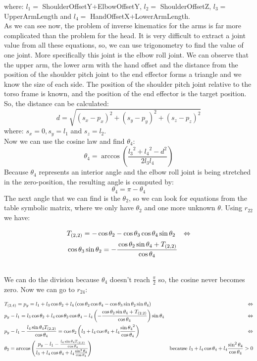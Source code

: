 where: $l_1 =$ ShoulderOffsetY$+$ElbowOffsetY, $l_2 =$ ShoulderOffsetZ, $l_3 =$ UpperArmLength and $l_4 =$ HandOffsetX$+$LowerArmLength.\\
As we can see now, the problem of inverse kinematics for the arms is far more complicated than the problem for the head. It is very difficult to extract a joint value from all these equations, so, we can use trigonometry to find the value of one joint. More specifically this joint is the elbow roll joint. We can observe that the upper arm, the lower arm with the hand offset and the distance from the position of the shoulder pitch joint to the end effector forms a triangle and we know the size of each side. The position of the shoulder pitch joint relative to the torso frame is known, and the position of the end effector is the target position. So, the distance can be calculated:
\[
d=\sqrt{\left(s_x-p_x\right)^2 + \left(s_y-p_y\right)^2 + \left(s_z-p_z\right)^2}
\]
where: \(s_x = 0, s_y = l_1\) and \(s_z = l_2\).\\
Now we can use the cosine law and find \(\theta_4\):
\[
\theta_4 = \arccos\left(\frac{{l_3}^2 + {l_4}^2 - d^2}{2l_3l_4}\right)
\]
Because \(\theta_4\) represents an interior angle and the elbow roll joint is being stretched in the zero-position, the resulting angle is computed by:
\[
\theta_4 = \pi - \theta_4
\]
The next angle that we can find is the \(\theta_2\), so we can look for equations from the table symbolic matrix, where we only have \(\theta_2\) and one more unknown \(\theta\). Using $r_{22}$ we have:
\begin{small}
\begin{align*}
&T_{(2,2)} = -\cos\theta_2 - \cos\theta_3\cos\theta_4\sin\theta_2 &\Leftrightarrow\\
&\cos\theta_3\sin\theta_2 = -\cfrac{\cos\theta_2\sin\theta_4 + T_{(2,2)}}{\cos\theta_4}
\end{align*}
\end{small}\\
We can do the division because $\theta_4$ doesn't reach $\frac{\pi}{2} $ so, the cosine never becomes zero. Now we can go to $r_{24}$:
\begin{small}
\begin{align*}
&T_{(2,4)} = p_y = l_1 + l_3\cos\theta_2 + l_4\left(\cos\theta_2\cos\theta_4 - \cos\theta_3\sin\theta_2\sin\theta_4\right)&\Leftrightarrow\\
&p_y - l_1 =l_3\cos\theta_2 + l_4\cos\theta_2\cos\theta_4 - l_4\left(-\frac{\cos\theta_2\sin\theta_4 + T_{(2,2)}}{\cos\theta_4}\right)\sin\theta_4&\Leftrightarrow\\
&p_y - l_1 - \frac{l_4\sin\theta_4 T_{(2,2)}}{\cos\theta_4} = \cos\theta_2\left(l_3 + l_4\cos\theta_4 + l_4\frac{{\sin\theta_4}^2}{\cos\theta_4}\right)&\Leftrightarrow\\
&\theta_2 = \arccos\left(\cfrac{p_y - l_1 - \frac{l_4\sin\theta_4 T_{(2,2)}}{\cos\theta_4}}{l_3 + l_4\cos\theta_4 + l_4\frac{\sin^2\theta_4}{\cos\theta_4}}\right) & \text{because }   l_3 + l_4\cos\theta_4 + l_4\frac{\sin^2\theta_4}{\cos\theta_4}>0
\end{align*}
\end{small}\\
